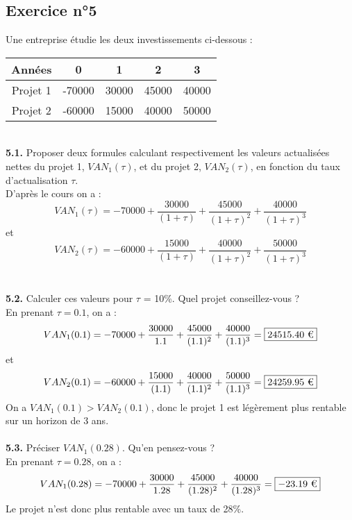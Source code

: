 \documentclass{article}
\begin{document}
\subsection{Exercice n°5}
\textcolor{exogris}{
Une entreprise étudie les deux investissements ci-dessous :
\begin{center}
\begin{tabular}{ |c|c|c|c|c| } 
 \hline
 Années & 0 & 1 & 2 & 3 \\ \hline
 Projet 1 & -70000 & 30000 & 45000 & 40000 \\ \hline
 Projet 2 & -60000 & 15000 & 40000 & 50000 \\
 \hline
\end{tabular}
\end{center}
}%
 
%
\\ \textcolor{exogris}{\textbf{5.1.}
Proposer deux formules calculant respectivement les valeurs actualisées nettes du projet 1, $VAN_1(\tau)$, et du projet 2, $VAN_2(\tau)$, en fonction du taux d’actualisation $\tau$.
}
\\%
D'après le cours on a :
$$VAN_1(\tau) = -70000 + \dfrac{30000}{(1+\tau)} + \dfrac{45000}{(1+\tau)^2} + \dfrac{40000}{(1+\tau)^3}$$
et 
$$VAN_2(\tau) = -60000 + \dfrac{15000}{(1+\tau)} + \dfrac{40000}{(1+\tau)^2} + \dfrac{50000}{(1+\tau)^3}$$
\\%
\\%
\textcolor{exogris}{\textbf{5.2.}
Calculer ces valeurs pour $\tau$ = 10\%. Quel projet conseillez-vous ?
}
\\%
En prenant $\tau = 0.1$, on a :
$$VAN_1(0.1) = -70000 + \dfrac{30000}{1.1} + \dfrac{45000}{(1.1)^2} + \dfrac{40000}{(1.1)^3} = \boxed{24515.40 \text{ \texteuro}}$$
et 
$$VAN_2(0.1) = -60000 + \dfrac{15000}{(1.1)} + \dfrac{40000}{(1.1)^2} + \dfrac{50000}{(1.1)^3} = \boxed{24259.95 \text{ \texteuro}}$$
On a $VAN_1(0.1) > VAN_2(0.1)$, donc le projet 1 est légèrement plus rentable sur un horizon de 3 ans.
\\%
\\%
\textcolor{exogris}{\textbf{5.3.}
Préciser $VAN_1(0.28)$. Qu’en pensez-vous ?
}%
\\%
En prenant $\tau = 0.28$, on a :
$$VAN_1(0.28) = -70000 + \dfrac{30000}{1.28} + \dfrac{45000}{(1.28)^2} + \dfrac{40000}{(1.28)^3} = \boxed{-23.19 \text{ \texteuro}}$$
Le projet n'est donc plus rentable avec un taux de 28\%.
\end{document}
